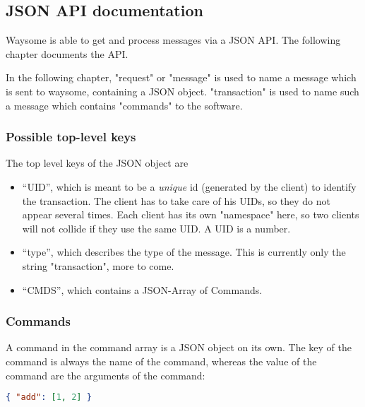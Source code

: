 \subsection{JSON API documentation}

    Waysome is able to get and process messages via a JSON API. The following
    chapter documents the API.

    In the following chapter, "request" or "message" is used to name a message
    which is sent to waysome, containing a JSON object. "transaction" is used to
    name such a message which contains "commands" to the software.

    \subsubsection{Possible top-level keys}

        The top level keys of the JSON object are

        \begin{itemize}
            \item ``UID'', which is meant to be a \emph{unique} id (generated by
                the client) to identify the transaction. The client has to take
                care of his UIDs, so they do not appear several times. Each
                client has its own "namespace" here, so two clients will not
                collide if they use the same UID.  A UID is a number.

            \item ``type'', which describes the type of the message. This is
                currently only the string "transaction", more to come.

            \item ``CMDS'', which contains a JSON-Array of Commands.
        \end{itemize}

    \subsubsection{Commands}

        A command in the command array is a JSON object on its own. The key of
        the command is always the name of the command, whereas the value of the
        command are the arguments of the command:

        \begin{lstlisting}[language=json]
            { "add": [1, 2] }
        \end{lstlisting}

